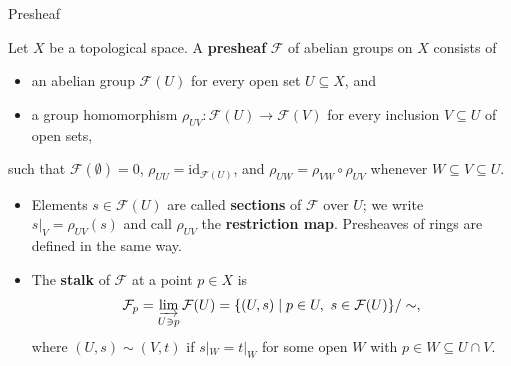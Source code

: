 \documentclass[10pt,aspectratio=1610]{beamer}
\newcommand{\FF}{\mathcal{F}}
\begin{document}
    \begin{frame}{Presheaf}
        \begin{definition}[Presheaf]
            Let $X$ be a topological space. A \textbf{presheaf} $\FF$ of abelian groups on $X$ consists of
            \begin{itemize}
                \item an abelian group $\FF(U)$ for every open set $U \subseteq X$, and
                \item a group homomorphism $\rho_{UV} \colon \FF(U) \to \FF(V)$ for every inclusion $V \subseteq U$ of open sets,
            \end{itemize}
            such that $\FF(\emptyset) = 0$, $\rho_{UU} = \mathrm{id}_{\FF(U)}$, and $\rho_{UW} = \rho_{VW} \circ \rho_{UV}$ whenever $W \subseteq V \subseteq U$.
        \end{definition}
        \begin{itemize}
            \item Elements $s \in \FF(U)$ are called \textbf{sections} of $\FF$ over $U$; we write $s|_V = \rho_{UV}(s)$ and call $\rho_{UV}$ the \textbf{restriction map}. Presheaves of rings are defined in the same way.
            \item The \textbf{stalk} of $\FF$ at a point $p \in X$ is
            \begin{align*}
                \FF_p = \varinjlim_{U \ni p} \FF(U) = \{(U, s) \mid p \in U,\ s \in \FF(U)\} / \sim,
            \end{align*}
            where $(U,s) \sim (V,t)$ if $s|_W = t|_W$ for some open $W$ with $p \in W \subseteq U \cap V$.
        \end{itemize}
    \end{frame}
\end{document}
